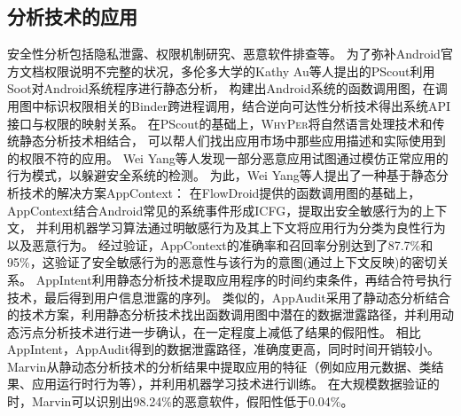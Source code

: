 \subsection{分析技术的应用}



安全性分析包括隐私泄露、权限机制研究、恶意软件排查等。
为了弥补Android官方文档权限说明不完整的状况，多伦多大学的Kathy Au等人提出的PScout\cite{au2012pscout}利用Soot对Android系统程序进行静态分析，
构建出Android系统的函数调用图，在调用图中标识权限相关的Binder跨进程调用，结合逆向可达性分析技术得出系统API接口与权限的映射关系。
在PScout的基础上，\textsc{WhyPer}\cite{pandita2013whyper}将自然语言处理技术和传统静态分析技术相结合，
可以帮人们找出应用市场中那些应用描述和实际使用到的权限不符的应用。
{Wei Yang等人发现一部分恶意应用试图通过模仿正常应用的行为模式，以躲避安全系统的检测。}
为此，Wei Yang等人提出了一种基于静态分析技术的解决方案AppContext\cite{yang2015appcontext}：
在FlowDroid提供的函数调用图的基础上，AppContext结合Android常见的系统事件形成ICFG，提取出安全敏感行为的上下文，
并利用机器学习算法通过明敏感行为及其上下文将应用行为分类为良性行为以及恶意行为。
经过验证，AppContext的准确率和召回率分别达到了87.7\%和95\%，这验证了安全敏感行为的恶意性与该行为的意图(通过上下文反映)的密切关系。
AppIntent\cite{yang2013appintent}利用静态分析技术提取应用程序的时间约束条件，再结合符号执行技术，最后得到用户信息泄露的序列。
类似的，AppAudit\cite{xia2015effective}采用了静动态分析结合的技术方案，利用静态分析技术找出函数调用图中潜在的数据泄露路径，并利用动态污点分析技术进行进一步确认，在一定程度上减低了结果的假阳性。
相比AppIntent，AppAudit得到的数据泄露路径，准确度更高，同时时间开销较小。
Marvin\cite{lindorfer2015marvin}从静动态分析技术的分析结果中提取应用的特征（例如应用元数据、类结果、应用运行时行为等），并利用机器学习技术进行训练。
在大规模数据验证的时，Marvin可以识别出98.24\%的恶意软件，假阳性低于0.04\%。


